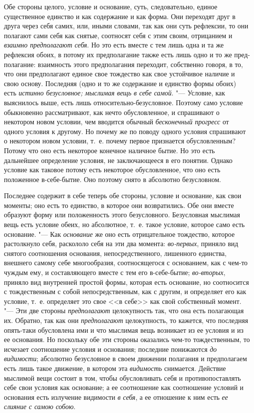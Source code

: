Обе стороны целого, условие и основание, суть, следовательно, единое
существенное единство и как содержание и как форма. Они переходят друг в
друга через себя самих, или, иными словами, так как они суть рефлексии, то
они полагают сами себя как снятые, соотносят себя с этим своим, отрицанием
и {\em взаимно предполагают себя}. Но это есть вместе с
тем лишь одна и та же рефлексия обоих, в потому их предполагание также есть
лишь одно и то же пред- полагание: взаимность этого предполагания
переходит, собственно говоря, в то, что они предполагают единое свое
тождество как свое устойчивое наличие и свою основу. Последняя (одно и то
же содержание и единство формы обоих) есть {\em истинно
безусловное; мыслимая вещь в себе самой}. "--- Условие, как выяснилось выше,
есть лишь относительно-безусловное. Поэтому само условие обыкновенно
рассматривают, как нечто обусловленное, и спрашивают о некотором новом
условии, чем вводится обычный {\em бесконечный
прогресс} от одного условия к другому. Но почему же по поводу одного
условия спрашивают о некотором новом условии, т.~е. почему первое
признается обусловленным? Потому что оно есть некоторое конечное наличное
бытие. Но это есть дальнейшее определение условия, не заключающееся в его
понятии. Однако условие как таковое потому есть некоторое обусловленное,
что оно есть положенное в-себе-бытие. Оно поэтому снято в абсолютно
безусловном.

Последнее содержит в себе теперь обе стороны, условие и основание, как свои
моменты; оно есть то единство, в которое они возвратились. Обе они вместе
образуют форму или положенность этого безусловного. Безусловная мыслимая
вещь есть условие обеих, но абсолютное, т.~е. такое условие, которое само
есть основание. "--- Как {\em основание} же оно есть
отрицательное тождество, которое растолкнуло себя, раскололо себя на эти
два момента: {\em во-первых}, приняло вид снятого
соотношения основания, непосредственного, лишенного единства, внешнего
самому себе многообразия, соотносящегося с основанием, как с чем-то чуждым
ему, и составляющего вместе с тем его в-себе-бытие;
{\em во-вторых}, приняло вид внутренней простой формы,
которая есть основание, но соотносится с тождественным с собой
непосредственным, как с другим, и определяет его как условие, т.~е.
определяет это свое <<в себе>> как свой собственный момент. "--- Эти две стороны
{\em предполагают} целокупность так, что она есть
полагающая их. Обратно, так как они {\em предполагают}
целокупность, то кажется, что последняя опять-таки обусловлена ими и что
мыслимая вещь возникает из ее условия и из ее основания. Но поскольку обе
эти стороны оказались чем-то тождественным, то исчезает соотношение условия
и основания; последние понижаются {\em до видимости};
абсолютно безусловное в своем движении полагания и предполагаем есть лишь
такое движение, в котором эта {\em видимость}
снимается. Действие мыслимой вещи состоит в том, чтобы обусловливать себя и
противопоставлять себе свои условия как основание; а ее соотношение как
соотношение условий и основания есть излучение видимости
{\em в себя}, а ее отношение к ним есть
{\em ее слияние с самою собою}.


